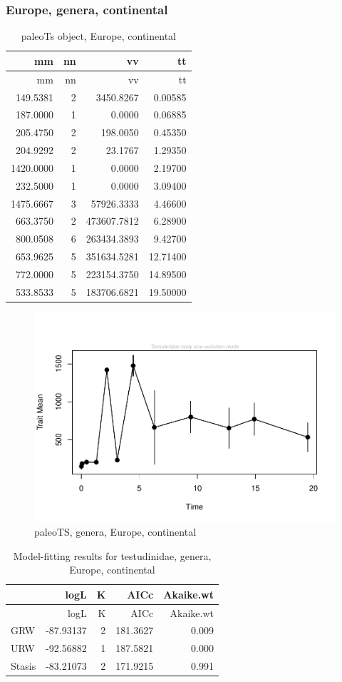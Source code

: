 \subsubsection*{Europe, genera, continental}\label{europe-genera-continental}

\begin{longtable}[]{@{}rrrr@{}}
	\caption{paleoTs object, Europe, continental}
	\label{tab:pTSEuC}\tabularnewline
	\toprule
	mm & nn & vv & tt\tabularnewline
	\midrule
	\endfirsthead
	\toprule
	mm & nn & vv & tt\tabularnewline
	\midrule
	\endhead
	149.5381 & 2 & 3450.8267 & 0.00585\tabularnewline
	187.0000 & 1 & 0.0000 & 0.06885\tabularnewline
	205.4750 & 2 & 198.0050 & 0.45350\tabularnewline
	204.9292 & 2 & 23.1767 & 1.29350\tabularnewline
	1420.0000 & 1 & 0.0000 & 2.19700\tabularnewline
	232.5000 & 1 & 0.0000 & 3.09400\tabularnewline
	1475.6667 & 3 & 57926.3333 & 4.46600\tabularnewline
	663.3750 & 2 & 473607.7812 & 6.28900\tabularnewline
	800.0508 & 6 & 263434.3893 & 9.42700\tabularnewline
	653.9625 & 5 & 351634.5281 & 12.71400\tabularnewline
	772.0000 & 5 & 223154.3750 & 14.89500\tabularnewline
	533.8533 & 5 & 183706.6821 & 19.50000\tabularnewline
	\bottomrule
\end{longtable}

\begin{figure}[H]
	\centering
	\includegraphics{MA_JJ_files/figure-latex/pTSEuC-1.pdf}
	\caption{paleoTS, genera, Europe, continental}
	\label{fig:pTSEuC}
\end{figure}

\begin{longtable}[]{@{}lrrrr@{}}
	\caption{Model-fitting results for testudinidae, genera, Europe,
		continental}
	\label{tab:pTSEuCEM}\tabularnewline
	\toprule
	& logL & K & AICc & Akaike.wt\tabularnewline
	\midrule
	\endfirsthead
	\toprule
	& logL & K & AICc & Akaike.wt\tabularnewline
	\midrule
	\endhead
	GRW & -87.93137 & 2 & 181.3627 & 0.009\tabularnewline
	URW & -92.56882 & 1 & 187.5821 & 0.000\tabularnewline
	Stasis & -83.21073 & 2 & 171.9215 & 0.991\tabularnewline
	\bottomrule
\end{longtable}


